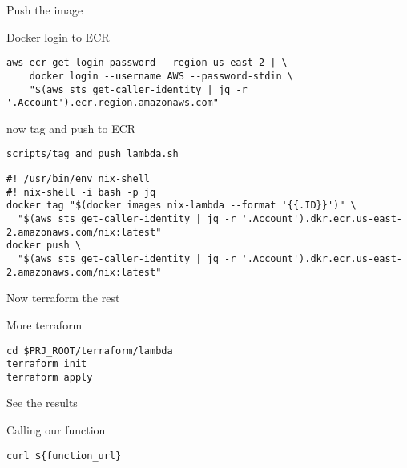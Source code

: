 \documentclass[bigger]{beamer}
\begin{document}
\begin{frame}[label={sec:orgdb34773},fragile]{Push the image}
 \begin{exampleblock}{Docker login to ECR}
\begin{verbatim}
aws ecr get-login-password --region us-east-2 | \
    docker login --username AWS --password-stdin \
    "$(aws sts get-caller-identity | jq -r '.Account').ecr.region.amazonaws.com"
\end{verbatim}
\end{exampleblock}
\begin{exampleblock}{now tag and push to ECR}
\begin{verbatim}
scripts/tag_and_push_lambda.sh
\end{verbatim}
\tiny
\begin{verbatim}
#! /usr/bin/env nix-shell
#! nix-shell -i bash -p jq
docker tag "$(docker images nix-lambda --format '{{.ID}}')" \
  "$(aws sts get-caller-identity | jq -r '.Account').dkr.ecr.us-east-2.amazonaws.com/nix:latest"
docker push \
  "$(aws sts get-caller-identity | jq -r '.Account').dkr.ecr.us-east-2.amazonaws.com/nix:latest"
\end{verbatim}
\end{exampleblock}
\end{frame}
\begin{frame}[label={sec:org4e8b1f4},fragile]{Now terraform the rest}
 \begin{exampleblock}{More terraform}
\begin{verbatim}
cd $PRJ_ROOT/terraform/lambda
terraform init
terraform apply
\end{verbatim}
\end{exampleblock}
\end{frame}
\begin{frame}[label={sec:org31ebd01},fragile]{See the results}
 \begin{exampleblock}{Calling our function}
\begin{verbatim}
curl ${function_url}
\end{verbatim}
\end{exampleblock}
\end{frame}
\end{document}
